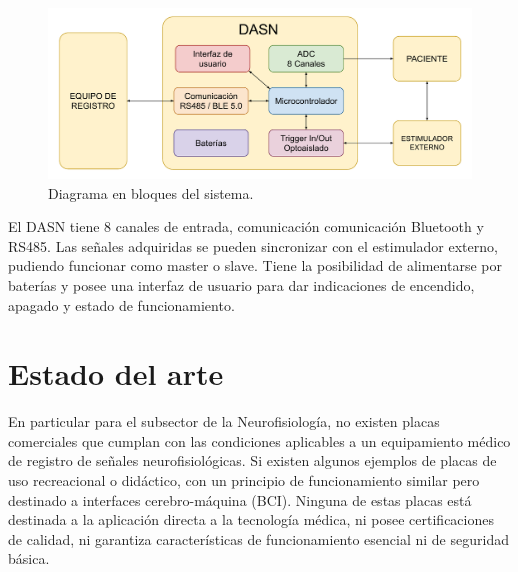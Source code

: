 \vspace{1cm}

\begin{figure}[htbp]
	\centering
	\includegraphics[width=1\textwidth]{./Figures/DiagramaEnBloquesDASN.pdf}
	\caption{Diagrama en bloques del sistema.}
	\label{fig:diagBloquesSistema}
\end{figure}

\vspace{1cm}

El DASN tiene 8 canales de entrada, comunicación comunicación Bluetooth y RS485. Las señales adquiridas se pueden sincronizar con el estimulador externo, pudiendo funcionar como master o slave. Tiene la posibilidad de alimentarse por baterías y posee una interfaz de usuario para dar indicaciones de encendido, apagado y estado de funcionamiento.

\section{Estado del arte}
En particular para el subsector de la Neurofisiología, no existen placas comerciales que cumplan con las condiciones aplicables a un equipamiento médico de registro de señales neurofisiológicas. Si existen algunos ejemplos de placas de uso recreacional o didáctico, con un principio de funcionamiento similar pero destinado a interfaces cerebro-máquina (BCI). Ninguna de estas placas está destinada a la aplicación directa a la tecnología médica, ni posee certificaciones de calidad, ni garantiza características de funcionamiento esencial ni de seguridad básica.

